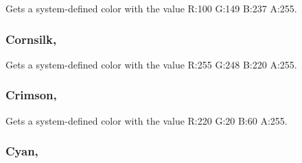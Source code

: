 Gets a system-\/defined color with the value R\+:100 G\+:149 B\+:237 A\+:255.

\hypertarget{structMicrosoft_1_1Xna_1_1Framework_1_1Color_a2ab29812e2c4665077e92c44baf87ea0}{}
\subsubsection[{Cornsilk}]{ Cornsilk\hspace{0.3cm}{\ttfamily [static]}, {\ttfamily [get]}}\label{structMicrosoft_1_1Xna_1_1Framework_1_1Color_a2ab29812e2c4665077e92c44baf87ea0}


Gets a system-\/defined color with the value R\+:255 G\+:248 B\+:220 A\+:255.

\hypertarget{structMicrosoft_1_1Xna_1_1Framework_1_1Color_aa4b9f94ce29d3647955af723a988237b}{}
\subsubsection[{Crimson}]{ Crimson\hspace{0.3cm}{\ttfamily [static]}, {\ttfamily [get]}}\label{structMicrosoft_1_1Xna_1_1Framework_1_1Color_aa4b9f94ce29d3647955af723a988237b}


Gets a system-\/defined color with the value R\+:220 G\+:20 B\+:60 A\+:255.

\hypertarget{structMicrosoft_1_1Xna_1_1Framework_1_1Color_a82ef18cd26a9f6281afd5fa9386ea86d}{}
\subsubsection[{Cyan}]{ Cyan\hspace{0.3cm}{\ttfamily [static]}, {\ttfamily [get]}}\label{structMicrosoft_1_1Xna_1_1Framework_1_1Color_a82ef18cd26a9f6281afd5fa9386ea86d}


